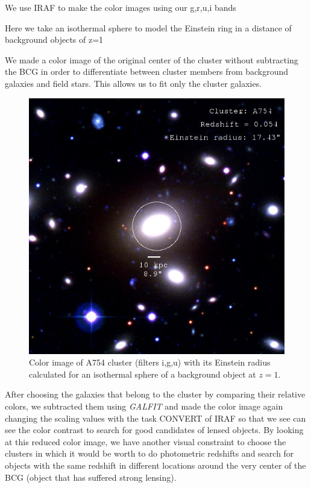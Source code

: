 We use IRAF to make the color images using our g,r,u,i bands 

Here we take an isothermal sphere to model the Einstein ring in a distance of background objects of z=1

We made a color image of the original center of the cluster without subtracting the BCG in order to differentiate between cluster members from background galaxies and field stars. This allows us to fit only the cluster galaxies. 

\begin{figure}[H]
\centering
\includegraphics[width=12cm]{images/cA754.jpg}
\caption[Color image of A754]{Color image of A754 cluster (filters i,g,u) with its Einstein radius calculated for an isothermal sphere of a background object at $z=1$.}
\end{figure}

After choosing the galaxies that belong to the cluster by comparing their relative colors, we subtracted them using \textit{GALFIT} and made the color image again changing the scaling values with the task CONVERT of IRAF so that we see can see the color contrast to search for good candidates of lensed objects. By looking at this reduced color image, we have another visual constraint to choose the clusters in which it would be worth to do photometric redshifts and search for objects with the same redshift in different locations around the very center of the BCG (object that has suffered strong lensing). 


